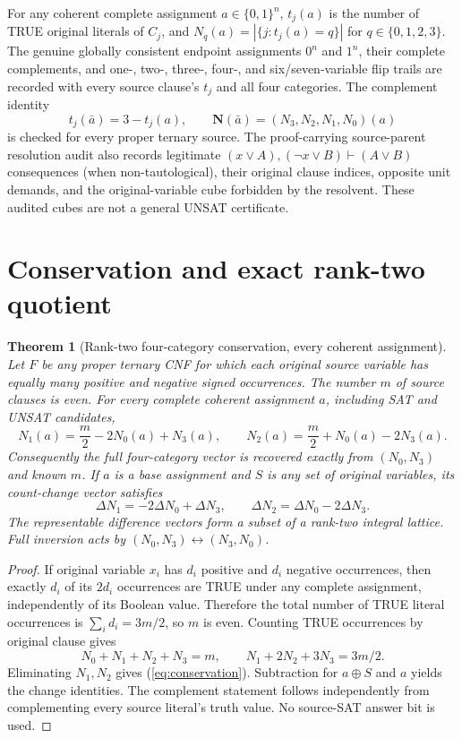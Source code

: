 \documentclass[11pt]{article}
\newtheorem{theorem}{Theorem}
\newcommand{\vN}{\boldsymbol N}
\begin{document}
For any coherent complete assignment $a\in\{0,1\}^n$, $t_j(a)$ is the number of TRUE original literals of $C_j$, and $N_q(a)=|\{j:t_j(a)=q\}|$ for $q\in\{0,1,2,3\}$. The genuine globally consistent endpoint assignments $0^n$ and $1^n$, their complete complements, and one-, two-, three-, four-, and six/seven-variable flip trails are recorded with every source clause's $t_j$ and all four categories. The complement identity
\[t_j(\bar a)=3-t_j(a),\qquad \vN(\bar a)=(N_3,N_2,N_1,N_0)(a)\]
is checked for every proper ternary source. The proof-carrying source-parent resolution audit also records legitimate $(x\lor A),(\neg x\lor B)\vdash(A\lor B)$ consequences (when non-tautological), their original clause indices, opposite unit demands, and the original-variable cube forbidden by the resolvent. These audited cubes are not a general UNSAT certificate.

\section{Conservation and exact rank-two quotient}
\begin{theorem}[Rank-two four-category conservation, every coherent assignment]\label{thm:two}
Let $F$ be any proper ternary CNF for which each original source variable has equally many positive and negative signed occurrences. The number $m$ of source clauses is even. For \emph{every} complete coherent assignment $a$, including SAT and UNSAT candidates,
\begin{equation}\label{eq:conservation}
\boxed{N_1(a)=\frac m2-2N_0(a)+N_3(a),\qquad N_2(a)=\frac m2+N_0(a)-2N_3(a).}
\end{equation}
Consequently the full four-category vector is recovered exactly from $(N_0,N_3)$ and known $m$. If $a$ is a base assignment and $S$ is any set of original variables, its count-change vector satisfies
\[\boxed{\Delta N_1=-2\Delta N_0+\Delta N_3,\qquad \Delta N_2=\Delta N_0-2\Delta N_3.}\]
The representable difference vectors form a subset of a rank-two integral lattice. Full inversion acts by $(N_0,N_3)\leftrightarrow(N_3,N_0)$.
\end{theorem}
\begin{proof}
If original variable $x_i$ has $d_i$ positive and $d_i$ negative occurrences, then exactly $d_i$ of its $2d_i$ occurrences are TRUE under any complete assignment, independently of its Boolean value. Therefore the total number of TRUE literal occurrences is $\sum_i d_i=3m/2$, so $m$ is even. Counting TRUE occurrences by original clause gives
\[N_0+N_1+N_2+N_3=m,\qquad N_1+2N_2+3N_3=3m/2.\]
Eliminating $N_1,N_2$ gives (\ref{eq:conservation}). Subtraction for $a\oplus S$ and $a$ yields the change identities. The complement statement follows independently from complementing every source literal's truth value. No source-SAT answer bit is used.\end{proof}
\end{document}
